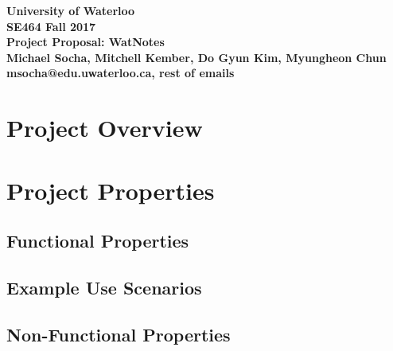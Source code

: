 \documentclass[12pt]{article}
\begin{document}
\begin{center}
\vspace*{\fill}
{\Large\bf University of Waterloo}\\
\vspace{3mm}
{\Large\bf SE464 Fall 2017}\\
\vspace{3mm}
{\large\bf Project Proposal: WatNotes}\\
\vspace{3mm}
{\large\bf Michael Socha, Mitchell Kember, Do Gyun Kim, Myungheon Chun}\\
\vspace{3mm}
{\large\bf msocha@edu.uwaterloo.ca, rest of emails}\\
\vspace*{\fill}
\end{center}

\newpage

\section{Project Overview}

\newpage

\section{Project Properties}
\subsection{Functional Properties}
\subsection{Example Use Scenarios}
\subsection{Non-Functional Properties}
\end{document}

